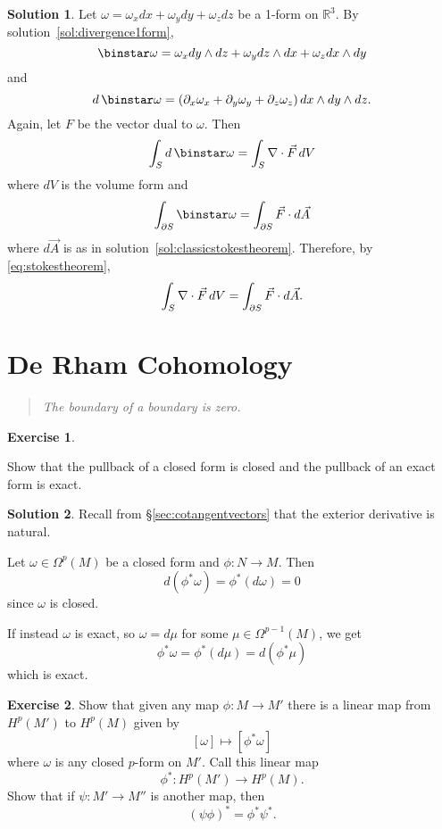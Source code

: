 \documentclass[11pt, a4paper]{report}
\theoremstyle{definition}
\newtheorem{exercise}{Exercise}[part]
\newtheorem{solution}{Solution}[part]
\newenvironment{ex}{\begin{exercise}}{\end{exercise}\pagebreak[1]}
\newenvironment{sol}{\begin{solution}}{\end{solution}\pagebreak[3]}
\newenvironment{epigraph}
    {\begin{quote}\small\itshape} %
    {\end{quote}\ignorespacesafterend\vspace{\parskip}}
\renewcommand*{\d}{\ensuremath\mathop{}\mathopen{}d}
\renewcommand*{\star}{\ensuremath\mathop{}\mathopen\binstar\mathord{}}
\begin{document}
\begin{sol}

Let $\omega = \omega_x dx + \omega_y dy + \omega_z dz$ be a 1-form on $\mathbb{R}^3$. By solution~\ref{sol:divergence1form},
\[
    \star \omega = \omega_x dy \wedge dz + \omega_y dz \wedge dx + \omega_z dx \wedge dy
\]
and
\[
    d \star \omega = (\partial_x \omega_x + \partial_y \omega_y + \partial_z \omega_z) \d x \wedge dy \wedge dz.
\]
Again, let $F$ be the vector dual to $\omega$. Then
\[
    \int_S d \star \omega = \int_S \nabla \cdot \vec{F} \d V
\]
where $dV$ is the volume form and
\[
    \int_{\partial S} \star \omega = \int_{\partial S} \vec{F} \cdot d\vec{A}
\]
where $d\vec{A}$ is as in solution~\ref{sol:classicstokestheorem}.
Therefore, by \ref{eq:stokestheorem}, %
\[
    \int_S \nabla \cdot \vec{F} \d V = \int_{\partial S} \vec{F} \cdot d\vec{A}.
\]

\end{sol}

\section{De Rham Cohomology}

\begin{epigraph}
    The boundary of a boundary is zero.
\end{epigraph}

\begin{ex}\label{ex:pullbackclosedandexact}

Show that the pullback of a closed form is closed
and the pullback of an exact form is exact.

\end{ex}

\begin{sol}

Recall from \S\ref{sec:cotangentvectors} that the exterior derivative is natural.

Let $\omega \in \Omega^p(M)$ be a closed form and $\phi: N \to M$. Then
\[
    d (\phi^* \omega) = \phi^* (d \omega) = 0
\]
since $\omega$ is closed.

If instead $\omega$ is exact, so $\omega = d\mu$ for some $\mu \in \Omega^{p - 1}(M)$, we get
\[
    \phi^* \omega = \phi^* (d \mu) = d (\phi^* \mu)
\]
which is exact.

\end{sol}

\begin{ex}

Show that given any map $\phi: M \to M'$ there is a linear map from $H^p(M')$ to $H^p(M)$ given by
\[
    [\omega] \mapsto [\phi^* \omega]
\]
where $\omega$ is any closed $p$-form on $M'$. Call this linear map
\[
    \phi^*: H^p(M') \to H^p(M).
\]
Show that if $\psi: M' \to M''$ is another map, then
\[
    {(\psi \phi)}^* = \phi^* \psi^*.
\]

\end{ex}
\end{document}
